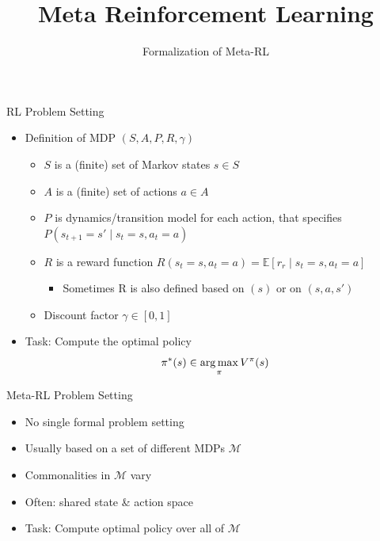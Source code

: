 \documentclass[aspectratio=169]{../latex_main/tntbeamer}  %
\title[Meta-RL]{Meta Reinforcement Learning}
\subtitle{Formalization of Meta-RL}
\begin{document}
	
	\maketitle

\begin{frame}[c]{RL Problem Setting}

\begin{itemize}
	\item Definition of MDP $(S,A,P, R, \gamma)$
	\begin{itemize}
		\item $S$ is a (finite) set of Markov states $s \in S$
		\item $A$ is a (finite) set of actions $a \in A$
		\item $P$ is dynamics/transition model for each action, that specifies $P(s_{t+1} = s' \mid s_t=s, a_t=a)$
		\item $R$ is a reward function 
		$R(s_t=s, a_t=a) = \mathbb{E}[r_r \mid s_t=s, a_t=a] $
		\begin{itemize}
			\item Sometimes R is also defined based on $(s)$ or on $(s,a,s')$
		\end{itemize}
		\item Discount factor $\gamma \in [0, 1]$
	\end{itemize}
	\bigskip
	\item Task: Compute the optimal policy
		$$ \pi^*(s)  \in \operatorname*{arg\,max}_\pi V^\pi(s)$$
\end{itemize}


\end{frame}
\begin{frame}[c]{Meta-RL Problem Setting}
	
\begin{itemize}
	\item No single formal problem setting
	\item Usually based on a set of different MDPs $\mathcal{M}$ 
	\item Commonalities in $\mathcal{M}$ vary
	\item Often: shared state \& action space
	\item Task: Compute optimal policy over all of $\mathcal{M}$
\end{itemize}
	
\end{frame}
\end{document}
